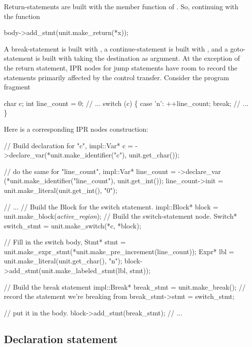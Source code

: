 \documentclass[a4paper,12pt]{article}
\begin{document}
Return-statements are built with the member function  of 
. So, continuing with the  function
\begin{Program}
body->add_stmt(unit.make_return(*x));  
\end{Program}

A break-statement is built with , a continue-statement
is built with , and a goto-statement is built with
 taking the destination as argument. At the exception of
the return statement, IPR nodes for jump statements have room to record the
statements primarily affected by the control transfer.  Consider the program
fragment 
\begin{Program}
  char c;
  int line_count = 0;
  // ...
  switch (c) \{
    case '{\bslash}n':
      ++line_count;
      break;
    // ...
  \}
\end{Program}

Here is a corresponding IPR nodes construction:
\begin{Program}
  // Build declaration for "c",
  impl::Var* c = ->declare_var(*unit.make_identifier("c"),
                                                   unit.get_char());

  // do the same for "line_count", 
  impl::Var* line_count = ->declare_var
     (*unit.make_identifier("line_count"), unit.get_int());
  line_count->init = unit.make_literal(unit.get_int(), "0");

  // ...
  // Build the Block for the switch statement.
  impl::Block* block = unit.make_block(\textit{active_region});
  // Build the switch-statement node.
  Switch* switch_stmt = unit.make_switch(*c, *block);

  // Fill in the switch body,
  Stmt* stmt = unit.make_expr_stmt(*unit.make_pre_increment(line_count));
  Expr* lbl = unit.make_literal(unit.get_char(), "{\bslash}n");
  block->add_stmt(unit.make_labeled_stmt(lbl, stmt));

    // Build the break statement
  impl::Break* break_stmt = unit.make_break();
    // record the statement we're breaking from
  break_stmt->stmt = switch_stmt;

    // put it in the body.
  block->add_stmt(break_stmt);
  // ...
\end{Program}


\subsection{Declaration statement}
\label{sec:stmt.declaration}
\end{document}
